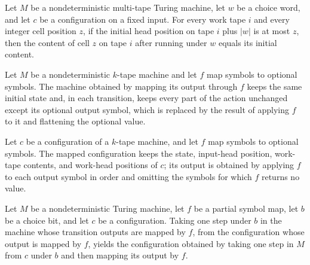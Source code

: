 \begin{theorem}
\label{Turing.NDTM.runWith_workTapes_of_le}
\leanok
{}
Let $M$ be a nondeterministic multi-tape Turing machine, let $w$ be a choice word, and
let $c$ be a configuration on a fixed input. For every work tape $i$ and every integer
cell position $z$, if the initial head position on tape $i$ plus $|w|$ is at most $z$,
then the content of cell $z$ on tape $i$ after running under $w$ equals its initial
content.
\end{theorem}

\begin{definition}
\label{Turing.NDTM.mapOutput}
\leanok
{}
Let $M$ be a nondeterministic $k$-tape machine and let $f$ map symbols to optional
symbols. The machine obtained by mapping its output through $f$ keeps the same initial
state and, in each transition, keeps every part of the action unchanged except its
optional output symbol, which is replaced by the result of applying $f$ to it and
flattening the optional value.
\end{definition}

\begin{definition}
\label{Turing.NDTM.mapOutputCfg}
\leanok
{}
Let $c$ be a configuration of a $k$-tape machine, and let $f$ map symbols to optional
symbols. The mapped configuration keeps the state, input-head position, work-tape
contents, and work-head positions of $c$; its output is obtained by applying $f$ to each
output symbol in order and omitting the symbols for which $f$ returns no value.
\end{definition}

\begin{theorem}
\label{Turing.NDTM.mapOutput_stepWith}
\leanok
{}
Let $M$ be a nondeterministic Turing machine, let $f$ be a partial symbol map, let $b$
be a choice bit, and let $c$ be a configuration. Taking one step under $b$ in the
machine whose transition outputs are mapped by $f$, from the configuration whose output
is mapped by $f$, yields the configuration obtained by taking one step in $M$ from $c$
under $b$ and then mapping its output by $f$.
\end{theorem}

